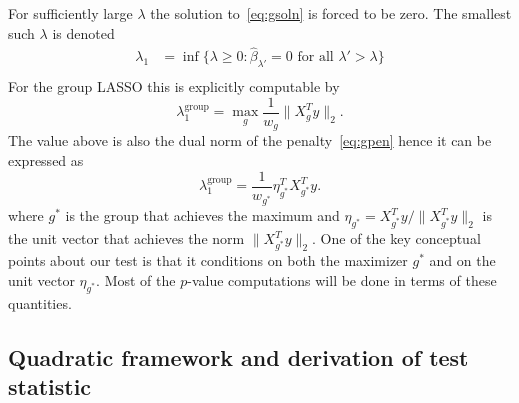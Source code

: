 \documentclass{imsart}
\begin{document}
For sufficiently large $\lambda$ the solution to~\eqref{eq:gsoln} is forced
to be zero. The smallest such $\lambda$ is denoted
\begin{equation}
  \begin{aligned}
   \lambda_1 &= \inf \{ \lambda \geq 0 : \hat \beta_{\lambda'} = 0 \text{ for all } \lambda' > \lambda \} \\
  \end{aligned}
\end{equation}
For the group LASSO this is explicitly computable by
\begin{equation}
\lambda_1^{\text{group}} = \max_{g} \frac{1}{w_g}\|X_g^Ty\|_2 . 
\end{equation}
The value above is also the dual norm of the penalty~\eqref{eq:gpen}
hence it can be expressed as
\begin{equation}
\label{eq:lammax}
\lambda_1^{\text{group}}
 = \frac{1}{w_{g^*}}\eta_{g^*}^TX_{g^*}^Ty . 
\end{equation}
where $g^*$ is the group that achieves the maximum and 
$\eta_{g^*} = X_{g^*}^Ty / \|X_{g^*}^Ty\|_2$ is the unit vector that achieves the norm $\|X_{g^*}^Ty\|_2$. One of the key conceptual points about our
test is that it conditions on both the maximizer $g^*$ and on the unit
vector $\eta_{g^*}$. Most of the $p$-value computations will be done in
terms of these quantities.




\subsection{Quadratic framework and derivation of test statistic}
\end{document}
